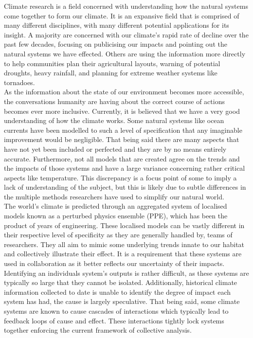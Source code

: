 \documentclass{ecmm427_assignment}
\begin{document}
\quad Climate research is a field concerned with understanding how the natural systems come together to form our climate. It is an expansive field that is comprised of many different disciplines, with many different potential applications for its insight. A majority are concerned with our climate's rapid rate of decline over the past few decades, focusing on publicising our impacts and pointing out the natural systems we have effected. Others are using the information more directly to help communities plan their agricultural layouts, warning of potential droughts, heavy rainfall, and planning for extreme weather systems like tornadoes.\\
\quad As the information about the state of our environment becomes more accessible, the conversations humanity are having about the correct course of actions becomes ever more inclusive. Currently, it is believed that we have a very good understanding of how the climate works. Some natural systems like ocean currents have been modelled to such a level of specification that any imaginable improvement would be negligible. That being said there are many aspects that have not yet been included or perfected and they are by no means entirely accurate. Furthermore, not all models that are created agree on the trends and the impacts of those systems and have a large variance concerning rather critical aspects like temperature. This discrepancy is a focus point of some to imply a lack of understanding of the subject, but this is likely due to subtle differences in the multiple methods researchers have used to simplify our natural world. \\

\quad The world's climate is predicted through an aggregated system of localised models known as a perturbed physics ensemble (PPE), which has been the product of years of engineering. These localised models can be vastly different in their respective level of specificity as they are generally handled by,  teams of researchers. They all aim to mimic some underlying trends innate to our habitat and collectively illustrate their effect. It is a requirement that these systems are used in collaboration as it better reflects our uncertainty of their impacts. Identifying an individuals system's outputs is rather difficult, as these systems are typically so large that they cannot be isolated. Additionally, historical climate information collected to date is unable to identify the degree of impact each system has had, the cause is largely speculative. That being said, some climate systems are known to cause cascades of interactions which typically lead to feedback loops of cause and effect. These interactions tightly lock systems together enforcing the current framework of collective analysis.\\
\end{document}
